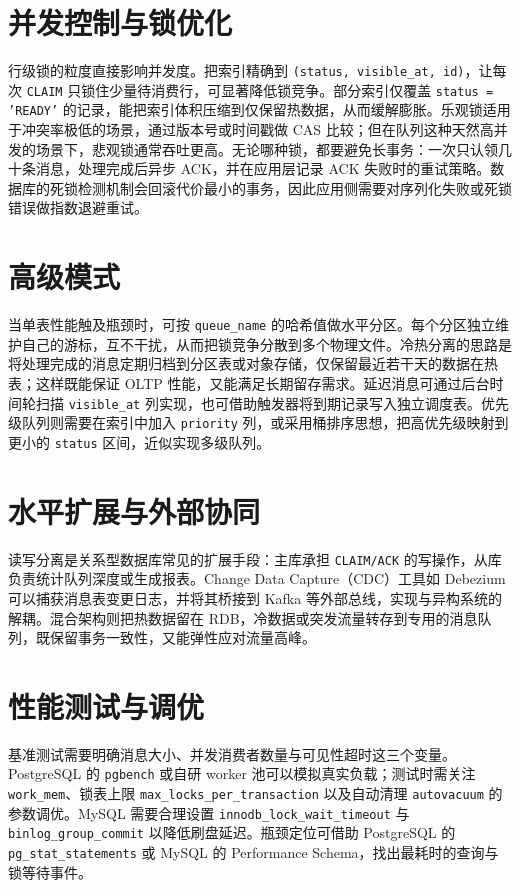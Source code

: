 \chapter{并发控制与锁优化}
行级锁的粒度直接影响并发度。把索引精确到 \texttt{(status, visible\_{}at, id)}，让每次 \texttt{CLAIM} 只锁住少量待消费行，可显著降低锁竞争。部分索引仅覆盖 \texttt{status = 'READY'} 的记录，能把索引体积压缩到仅保留热数据，从而缓解膨胀。乐观锁适用于冲突率极低的场景，通过版本号或时间戳做 CAS 比较；但在队列这种天然高并发的场景下，悲观锁通常吞吐更高。无论哪种锁，都要避免长事务：一次只认领几十条消息，处理完成后异步 ACK，并在应用层记录 ACK 失败时的重试策略。数据库的死锁检测机制会回滚代价最小的事务，因此应用侧需要对序列化失败或死锁错误做指数退避重试。\par
\chapter{高级模式}
当单表性能触及瓶颈时，可按 \texttt{queue\_{}name} 的哈希值做水平分区。每个分区独立维护自己的游标，互不干扰，从而把锁竞争分散到多个物理文件。冷热分离的思路是将处理完成的消息定期归档到分区表或对象存储，仅保留最近若干天的数据在热表；这样既能保证 OLTP 性能，又能满足长期留存需求。延迟消息可通过后台时间轮扫描 \texttt{visible\_{}at} 列实现，也可借助触发器将到期记录写入独立调度表。优先级队列则需要在索引中加入 \texttt{priority} 列，或采用桶排序思想，把高优先级映射到更小的 \texttt{status} 区间，近似实现多级队列。\par
\chapter{水平扩展与外部协同}
读写分离是关系型数据库常见的扩展手段：主库承担 \texttt{CLAIM/ACK} 的写操作，从库负责统计队列深度或生成报表。Change Data Capture（CDC）工具如 Debezium 可以捕获消息表变更日志，并将其桥接到 Kafka 等外部总线，实现与异构系统的解耦。混合架构则把热数据留在 RDB，冷数据或突发流量转存到专用的消息队列，既保留事务一致性，又能弹性应对流量高峰。\par
\chapter{性能测试与调优}
基准测试需要明确消息大小、并发消费者数量与可见性超时这三个变量。PostgreSQL 的 \texttt{pgbench} 或自研 worker 池可以模拟真实负载；测试时需关注 \texttt{work\_{}mem}、锁表上限 \texttt{max\_{}locks\_{}per\_{}transaction} 以及自动清理 \texttt{autovacuum} 的参数调优。MySQL 需要合理设置 \texttt{innodb\_{}lock\_{}wait\_{}timeout} 与 \texttt{binlog\_{}group\_{}commit} 以降低刷盘延迟。瓶颈定位可借助 PostgreSQL 的 \texttt{pg\_{}stat\_{}statements} 或 MySQL 的 Performance Schema，找出最耗时的查询与锁等待事件。\par
